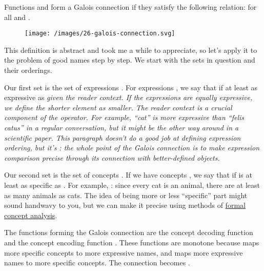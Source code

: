 \documentclass{article}
\begin{document}
Functions  and  form a Galois connection if they satisfy the following relation:
 for all  and .

\begin{figure}[grayscale-diagram,medium-size]
  \texttt{[image: /images/26-galois-connection.svg]}
\end{figure}

This definition is abstract and took me a while to appreciate, so let's apply it to the problem of good names step by step.
We start with the sets in question and their orderings.

Our first set is the set of expressions .
For expressions , we say that  if  at least as expressive as  \em{given the reader context}.
If the expressions are equally expressive, we define the shorter element as smaller.
The reader context is a crucial component of the \math{\leq} operator.
For example, ``cat'' is more expressive than ``felis catus'' in a regular conversation, but it might be the other way around in a scientific paper.
This paragraph doesn't do a good job at defining expression ordering, but it's : the whole point of the Galois connection is to make expression comparison precise through its connection with better-defined objects.

Our second set is the set of concepts .
If we have concepts , we say that  if  is at least as specific as .
For example, : since every cat is an animal, there are at least as many animals as cats.
The idea of being more or less ``specific'' part might sound handwavy to you, but we can make it precise using methods of \href{https://en.wikipedia.org/wiki/Formal_concept_analysis}{formal concept analysis}.

The functions forming the Galois connection are the concept decoding function  and the concept encoding function .
These functions are monotone because  maps more specific concepts to more expressive names, and  maps more expressive names to more specific concepts.
The connection becomes .
\end{document}
